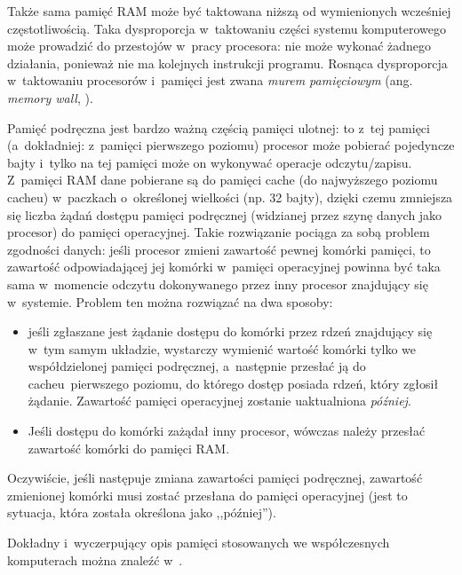 \documentclass[12pt]{mwart}
\begin{document}
	Także sama pamięć RAM może być taktowana niższą od wymienionych wcześniej częstotliwością.
	Taka dysproporcja w~taktowaniu części systemu komputerowego może prowadzić do przestojów w~pracy procesora: nie może wykonać żadnego działania,
	ponieważ nie ma kolejnych instrukcji programu. Rosnąca dysproporcja w~taktowaniu procesorów i~pamięci jest zwana \emph{murem pamięciowym}
	(ang. \emph{memory wall}, \cite{wulf}).
\par
%
\indent
	Pamięć podręczna jest bardzo ważną częścią pamięci ulotnej: to z~tej pamięci (a~dokładniej: z~pamięci pierwszego poziomu) procesor
	może pobierać pojedyncze bajty i~tylko na tej pamięci może on wykonywać operacje odczytu/zapisu. 
	Z~pamięci RAM dane pobierane są do pamięci cache (do najwyższego poziomu cache\dywiz u) w~paczkach o~określonej wielkości (np. 32 bajty),
	dzięki czemu zmniejsza się liczba żądań dostępu pamięci podręcznej (widzianej przez szynę danych jako procesor) do pamięci operacyjnej.
	Takie rozwiązanie pociąga za sobą problem zgodności danych: jeśli procesor zmieni zawartość pewnej komórki pamięci,
	to zawartość odpowiadającej jej komórki w~pamięci operacyjnej powinna być taka sama w~momencie odczytu dokonywanego przez inny procesor
	znajdujący się w~systemie. Problem ten można rozwiązać na dwa sposoby:
	\begin{itemize}
		\item jeśli zgłaszane jest żądanie dostępu do komórki przez rdzeń znajdujący się w~tym samym układzie, wystarczy wymienić wartość komórki
			tylko we współdzielonej pamięci podręcznej, a~następnie przesłać ją do cache\dywiz u~pierwszego poziomu, do którego dostęp posiada
			rdzeń, który zgłosił żądanie. Zawartość pamięci operacyjnej zostanie uaktualniona \emph{później}.
		\item Jeśli dostępu do komórki zażądał inny procesor, wówczas należy przesłać zawartość komórki do pamięci RAM.
	\end{itemize}
	Oczywiście, jeśli następuje zmiana zawartości pamięci podręcznej, zawartość zmienionej komórki musi zostać przesłana do pamięci operacyjnej
	(jest to sytuacja, która została określona jako ,,później'').
\par
%
\indent
	Dokładny i~wyczerpujący opis pamięci stosowanych we współczesnych komputerach można znaleźć w~\cite{jacob}.
\par
%
\end{document}
